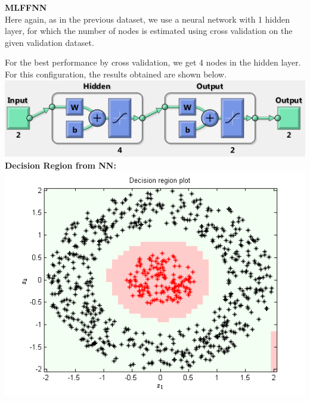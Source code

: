 \documentclass{article}
\begin{document}
\begin{flushleft}
\textbf{MLFFNN} \\[10pt]
Here again, as in the previous dataset, we use a neural network with 1 hidden layer, for which the number of nodes is estimated using cross validation on the given validation dataset.

For the best performance by cross validation, we get 4 nodes in the hidden layer. For this configuration, the results obtained are shown below.
\\[5pt]
\includegraphics[scale=0.6]{Classification/nonlinearlySeparable/net_config} \newpage
\textbf{Decision Region from NN:\\[5pt]}
\includegraphics[scale=1]{Classification/nonlinearlySeparable/decn_region_nn_nls}
\end{flushleft}
\end{document}
